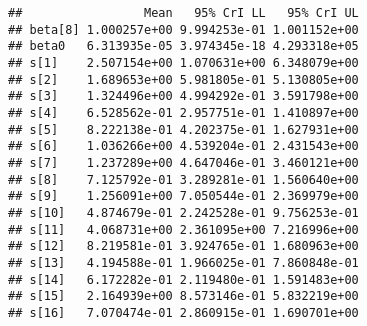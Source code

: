 \documentclass[]{article}
\newenvironment{Shaded}{\begin{snugshade}}{\end{snugshade}}
\newcommand{\CommentTok}[1]{\textcolor[rgb]{0.56,0.35,0.01}{\textit{#1}}}
\newcommand{\ControlFlowTok}[1]{\textcolor[rgb]{0.13,0.29,0.53}{\textbf{#1}}}
\newcommand{\DataTypeTok}[1]{\textcolor[rgb]{0.13,0.29,0.53}{#1}}
\newcommand{\DecValTok}[1]{\textcolor[rgb]{0.00,0.00,0.81}{#1}}
\newcommand{\FloatTok}[1]{\textcolor[rgb]{0.00,0.00,0.81}{#1}}
\newcommand{\KeywordTok}[1]{\textcolor[rgb]{0.13,0.29,0.53}{\textbf{#1}}}
\newcommand{\NormalTok}[1]{#1}
\newcommand{\OperatorTok}[1]{\textcolor[rgb]{0.81,0.36,0.00}{\textbf{#1}}}
\newcommand{\StringTok}[1]{\textcolor[rgb]{0.31,0.60,0.02}{#1}}
\begin{document}
\begin{Shaded}
\end{Shaded}

\begin{verbatim}
##                 Mean   95% CrI LL   95% CrI UL
## beta[8] 1.000257e+00 9.994253e-01 1.001152e+00
## beta0   6.313935e-05 3.974345e-18 4.293318e+05
## s[1]    2.507154e+00 1.070631e+00 6.348079e+00
## s[2]    1.689653e+00 5.981805e-01 5.130805e+00
## s[3]    1.324496e+00 4.994292e-01 3.591798e+00
## s[4]    6.528562e-01 2.957751e-01 1.410897e+00
## s[5]    8.222138e-01 4.202375e-01 1.627931e+00
## s[6]    1.036266e+00 4.539204e-01 2.431543e+00
## s[7]    1.237289e+00 4.647046e-01 3.460121e+00
## s[8]    7.125792e-01 3.289281e-01 1.560640e+00
## s[9]    1.256091e+00 7.050544e-01 2.369979e+00
## s[10]   4.874679e-01 2.242528e-01 9.756253e-01
## s[11]   4.068731e+00 2.361095e+00 7.216996e+00
## s[12]   8.219581e-01 3.924765e-01 1.680963e+00
## s[13]   4.194588e-01 1.966025e-01 7.860848e-01
## s[14]   6.172282e-01 2.119480e-01 1.591483e+00
## s[15]   2.164939e+00 8.573146e-01 5.832219e+00
## s[16]   7.070474e-01 2.860915e-01 1.690701e+00
\end{verbatim}
\end{document}
